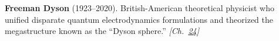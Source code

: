 \textbf{Freeman Dyson} (1923–2020). British-American theoretical physicist who unified disparate quantum electrodynamics formulations and theorized the megastructure known as the ``Dyson sphere.'' \emph{[Ch.~\hyperref[ch:4dspacetime]{24}]}


